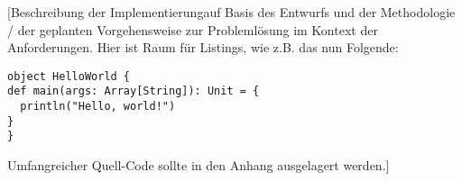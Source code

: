 
[Beschreibung der Implementierung\footnotemark auf Basis des Entwurfs und der Methodologie / der geplanten Vorgehensweise zur Probleml\"osung im Kontext der Anforderungen. Hier ist Raum f\"ur Listings, wie z.B. das nun Folgende:



\begin{lstlisting}[caption={Ein Beispiel: Hello World (Scala)}]
object HelloWorld {
def main(args: Array[String]): Unit = {
  println("Hello, world!")
}
}
\end{lstlisting}

Umfangreicher Quell-Code sollte in den Anhang ausgelagert werden.]
